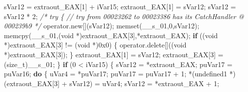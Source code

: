 \documentclass[
]{article}
\newenvironment{Shaded}{}{}
\newcommand{\BaseNTok}[1]{\textcolor[rgb]{0.25,0.63,0.44}{#1}}
\newcommand{\CommentTok}[1]{\textcolor[rgb]{0.38,0.63,0.69}{\textit{#1}}}
\newcommand{\ControlFlowTok}[1]{\textcolor[rgb]{0.00,0.44,0.13}{\textbf{#1}}}
\newcommand{\DataTypeTok}[1]{\textcolor[rgb]{0.56,0.13,0.00}{#1}}
\newcommand{\DecValTok}[1]{\textcolor[rgb]{0.25,0.63,0.44}{#1}}
\newcommand{\NormalTok}[1]{#1}
\newcommand{\OperatorTok}[1]{\textcolor[rgb]{0.40,0.40,0.40}{#1}}
\begin{document}
\begin{Shaded}
\begin{Highlighting}[]
\NormalTok{        sVar12 }\OperatorTok{=}\NormalTok{ extraout\_EAX}\OperatorTok{[}\DecValTok{1}\OperatorTok{]} \OperatorTok{+}\NormalTok{ iVar15}\OperatorTok{;}
\NormalTok{        extraout\_EAX}\OperatorTok{[}\DecValTok{1}\OperatorTok{]} \OperatorTok{=}\NormalTok{ sVar12}\OperatorTok{;}
\NormalTok{        sVar12 }\OperatorTok{=}\NormalTok{ sVar12 }\OperatorTok{*} \DecValTok{2}\OperatorTok{;}
                    \CommentTok{/* try \{ // try from 00023262 to 00023386 has its CatchHandler @ 000239b9 */}
\NormalTok{        operator}\OperatorTok{.}\NormalTok{new}\OperatorTok{[](}\NormalTok{sVar12}\OperatorTok{);}
\NormalTok{        memset}\OperatorTok{(}\NormalTok{\_\_s\_01}\OperatorTok{,}\DecValTok{0}\OperatorTok{,}\NormalTok{sVar12}\OperatorTok{);}
\NormalTok{        memcpy}\OperatorTok{(}\NormalTok{\_\_s\_01}\OperatorTok{,(}\DataTypeTok{void} \OperatorTok{*)}\NormalTok{extraout\_EAX}\OperatorTok{[}\DecValTok{3}\OperatorTok{],*}\NormalTok{extraout\_EAX}\OperatorTok{);}
        \ControlFlowTok{if} \OperatorTok{((}\DataTypeTok{void} \OperatorTok{*)}\NormalTok{extraout\_EAX}\OperatorTok{[}\DecValTok{3}\OperatorTok{]} \OperatorTok{!=} \OperatorTok{(}\DataTypeTok{void} \OperatorTok{*)}\BaseNTok{0x0}\OperatorTok{)} \OperatorTok{\{}
\NormalTok{          operator}\OperatorTok{.}\NormalTok{delete}\OperatorTok{[]((}\DataTypeTok{void} \OperatorTok{*)}\NormalTok{extraout\_EAX}\OperatorTok{[}\DecValTok{3}\OperatorTok{]);}
        \OperatorTok{\}}
\NormalTok{        extraout\_EAX}\OperatorTok{[}\DecValTok{1}\OperatorTok{]} \OperatorTok{=}\NormalTok{ sVar12}\OperatorTok{;}
\NormalTok{        extraout\_EAX}\OperatorTok{[}\DecValTok{3}\OperatorTok{]} \OperatorTok{=} \OperatorTok{(}\DataTypeTok{size\_t}\OperatorTok{)}\NormalTok{\_\_s\_01}\OperatorTok{;}
      \OperatorTok{\}}
      \ControlFlowTok{if} \OperatorTok{(}\DecValTok{0} \OperatorTok{\textless{}}\NormalTok{ iVar15}\OperatorTok{)} \OperatorTok{\{}
\NormalTok{        sVar12 }\OperatorTok{=} \OperatorTok{*}\NormalTok{extraout\_EAX}\OperatorTok{;}
\NormalTok{        puVar17 }\OperatorTok{=}\NormalTok{ puVar16}\OperatorTok{;}
        \ControlFlowTok{do} \OperatorTok{\{}
\NormalTok{          uVar4 }\OperatorTok{=} \OperatorTok{*}\NormalTok{puVar17}\OperatorTok{;}
\NormalTok{          puVar17 }\OperatorTok{=}\NormalTok{ puVar17 }\OperatorTok{+} \DecValTok{1}\OperatorTok{;}
          \OperatorTok{*(}\NormalTok{undefined1 }\OperatorTok{*)(}\NormalTok{extraout\_EAX}\OperatorTok{[}\DecValTok{3}\OperatorTok{]} \OperatorTok{+}\NormalTok{ sVar12}\OperatorTok{)} \OperatorTok{=}\NormalTok{ uVar4}\OperatorTok{;}
\NormalTok{          sVar12 }\OperatorTok{=} \OperatorTok{*}\NormalTok{extraout\_EAX }\OperatorTok{+} \DecValTok{1}\OperatorTok{;}

\end{Highlighting}
\end{Shaded}
\end{document}

